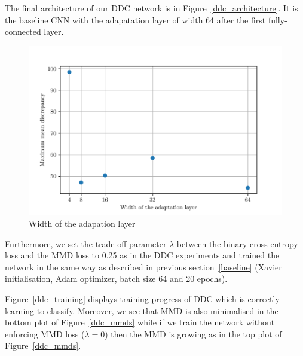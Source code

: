 The final architecture of our DDC network is in Figure~\ref{ddc_architecture}.
It is the baseline CNN with the adapatation layer of width 64
after the first fully-connected layer.

\begin{figure}
	\includegraphics[width=\textwidth]{img/adaptation_layer_width.pdf}
	\caption{Width of the adapation layer}
	\label{adaptation_layer}
\end{figure}

Furthermore, we set the trade-off parameter \(\lambda\)
between the binary cross entropy loss
and the MMD loss to 0.25 as in the DDC experiments
and trained the network in the same way as described in previous section~\ref{baseline}
(Xavier initialisation, Adam optimizer, batch size 64 and 20 epochs).

Figure~\ref{ddc_training} displays training progress of DDC
which is correctly learning to classify.
Moreover, we see that MMD is also minimalised in the bottom plot of Figure~\ref{ddc_mmds}
while if we train the network without enforcing MMD loss (\(\lambda = 0\))
then the MMD is growing as in the top plot of Figure~\ref{ddc_mmds}.

